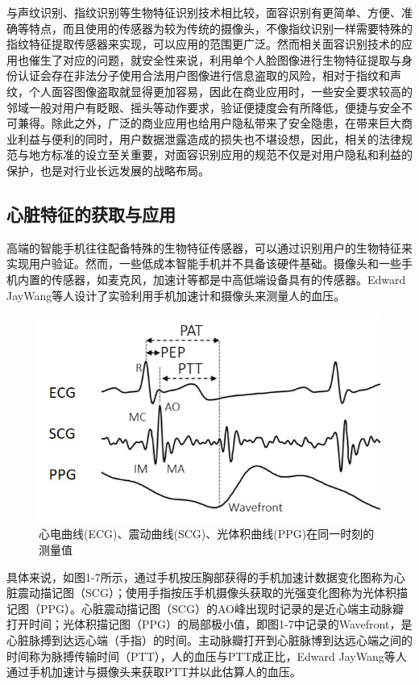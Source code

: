 {与声纹识别、指纹识别等生物特征识别技术相比较，面容识别有更简单、方便、准确等特点，而且使用的传感器为较为传统的摄像头，不像指纹识别一样需要特殊的指纹特征提取传感器来实现，可以应用的范围更广泛\cite{ 2022he}。然而相关面容识别技术的应用也催生了对应的问题，就安全性来说，利用单个人脸图像进行生物特征提取与身份认证会存在非法分子使用合法用户图像进行信息盗取的风险，相对于指纹和声纹，个人面容图像盗取就显得更加容易，因此在商业应用时，一些安全要求较高的邻域一般对用户有眨眼、摇头等动作要求，验证便捷度会有所降低，便捷与安全不可兼得。除此之外，广泛的商业应用也给用户隐私带来了安全隐患，在带来巨大商业利益与便利的同时，用户数据泄露造成的损失也不堪设想\cite{2023yang}，因此，相关的法律规范与地方标准的设立至关重要\cite{ 2023ren}，对面容识别应用的规范不仅是对用户隐私和利益的保护，也是对行业长远发展的战略布局。}
\subsection{心脏特征的获取与应用}
{高端的智能手机往往配备特殊的生物特征传感器，可以通过识别用户的生物特征来实现用户验证。然而，一些低成本智能手机并不具备该硬件基础。摄像头和一些手机内置的传感器，如麦克风，加速计等都是中高低端设备具有的传感器。Edward JayWang等人设计了实验利用手机加速计和摄像头来测量人的血压\cite{2018Blood}。}
\par
\begin{figure}[htbp]
  \centering
  \includegraphics[width=0.5\linewidth]{images/PTT.png}
  \caption{心电曲线(ECG)、震动曲线(SCG)、光体积曲线(PPG)在同一时刻的测量值\cite{2018Blood}}\label{1-7} %
\end{figure}
\par
{具体来说，如图1-7所示，通过手机按压胸部获得的手机加速计数据变化图称为心脏震动描记图（SCG）；使用手指按压手机摄像头获取的光强变化图称为光体积描记图（PPG）。心脏震动描记图（SCG）的AO峰出现时记录的是近心端主动脉瓣打开时间；光体积描记图（PPG）的局部极小值，即图1-7中记录的Wavefront，是心脏脉搏到达远心端（手指）的时间。主动脉瓣打开到心脏脉博到达远心端之间的时间称为脉搏传输时间（PTT），人的血压与PTT成正比，Edward JayWang等人通过手机加速计与摄像头来获取PTT并以此估算人的血压。}
\par
